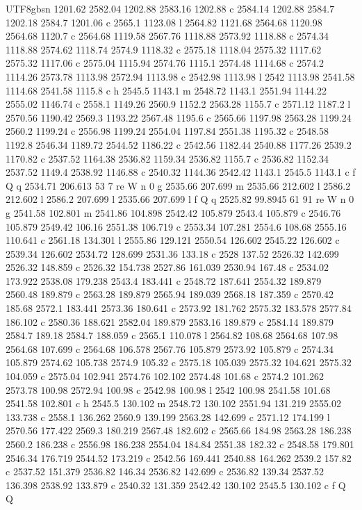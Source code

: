 \documentclass[11pt,a4paper,oneside]{report}
\begin{document}
\begin{CJK*}{UTF8}{gbsn}
{1201.62 2582.04 1202.88 2583.16 1202.88 c 2584.14 1202.88 2584.7 1202.18 2584.7 1201.06 c 2565.1 1123.08
l 2564.82 1121.68 2564.68 1120.98 2564.68 1120.7 c 2564.68 1119.58 2567.76 1118.88 2573.92 1118.88 c
2574.34 1118.88 2574.62 1118.74 2574.9 1118.32 c 2575.18 1118.04 2575.32 1117.62 2575.32 1117.06 c
2575.04 1115.94 2574.76 1115.1 2574.48 1114.68 c 2574.2 1114.26 2573.78 1113.98 2572.94 1113.98 c 2542.98
1113.98 l 2542 1113.98 2541.58 1114.68 2541.58 1115.8 c h 2545.5 1143.1 m 2548.72 1143.1 2551.94 1144.22
2555.02 1146.74 c 2558.1 1149.26 2560.9 1152.2 2563.28 1155.7 c 2571.12 1187.2 l 2570.56 1190.42 2569.3
1193.22 2567.48 1195.6 c 2565.66 1197.98 2563.28 1199.24 2560.2 1199.24 c 2556.98 1199.24 2554.04 1197.84
2551.38 1195.32 c 2548.58 1192.8 2546.34 1189.72 2544.52 1186.22 c 2542.56 1182.44 2540.88 1177.26 2539.2
1170.82 c 2537.52 1164.38 2536.82 1159.34 2536.82 1155.7 c 2536.82 1152.34 2537.52 1149.4 2538.92 1146.88
c 2540.32 1144.36 2542.42 1143.1 2545.5 1143.1 c f Q q 2534.71 206.613 53 7 re W n 0 g 2535.66 207.699 m
2535.66 212.602 l 2586.2 212.602 l 2586.2 207.699 l 2535.66 207.699 l f Q q 2525.82 99.8945 61 91 re W n
0 g 2541.58 102.801 m 2541.86 104.898 2542.42 105.879 2543.4 105.879 c 2546.76 105.879 2549.42 106.16
2551.38 106.719 c 2553.34 107.281 2554.6 108.68 2555.16 110.641 c 2561.18 134.301 l 2555.86 129.121
2550.54 126.602 2545.22 126.602 c 2539.34 126.602 2534.72 128.699 2531.36 133.18 c 2528 137.52 2526.32
142.699 2526.32 148.859 c 2526.32 154.738 2527.86 161.039 2530.94 167.48 c 2534.02 173.922 2538.08
179.238 2543.4 183.441 c 2548.72 187.641 2554.32 189.879 2560.48 189.879 c 2563.28 189.879 2565.94
189.039 2568.18 187.359 c 2570.42 185.68 2572.1 183.441 2573.36 180.641 c 2573.92 181.762 2575.32 183.578
2577.84 186.102 c 2580.36 188.621 2582.04 189.879 2583.16 189.879 c 2584.14 189.879 2584.7 189.18 2584.7
188.059 c 2565.1 110.078 l 2564.82 108.68 2564.68 107.98 2564.68 107.699 c 2564.68 106.578 2567.76
105.879 2573.92 105.879 c 2574.34 105.879 2574.62 105.738 2574.9 105.32 c 2575.18 105.039 2575.32 104.621
2575.32 104.059 c 2575.04 102.941 2574.76 102.102 2574.48 101.68 c 2574.2 101.262 2573.78 100.98 2572.94
100.98 c 2542.98 100.98 l 2542 100.98 2541.58 101.68 2541.58 102.801 c h 2545.5 130.102 m 2548.72 130.102
2551.94 131.219 2555.02 133.738 c 2558.1 136.262 2560.9 139.199 2563.28 142.699 c 2571.12 174.199 l
2570.56 177.422 2569.3 180.219 2567.48 182.602 c 2565.66 184.98 2563.28 186.238 2560.2 186.238 c 2556.98
186.238 2554.04 184.84 2551.38 182.32 c 2548.58 179.801 2546.34 176.719 2544.52 173.219 c 2542.56 169.441
2540.88 164.262 2539.2 157.82 c 2537.52 151.379 2536.82 146.34 2536.82 142.699 c 2536.82 139.34 2537.52
136.398 2538.92 133.879 c 2540.32 131.359 2542.42 130.102 2545.5 130.102 c f Q Q
}


\end{CJK*}
\end{document}
